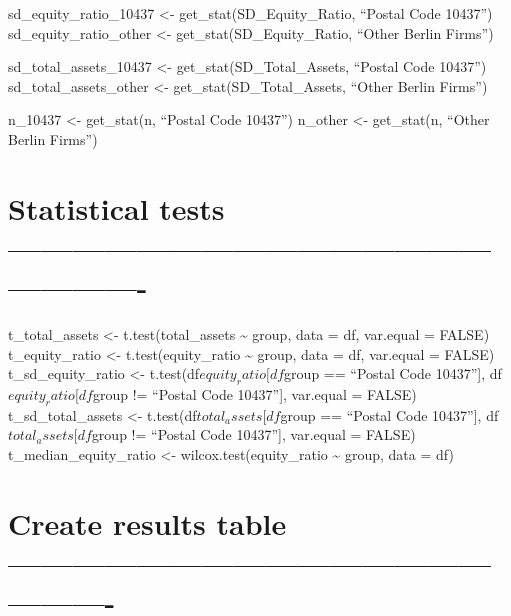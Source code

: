 \documentclass[
]{article}
\begin{document}
sd\_equity\_ratio\_10437 \textless- get\_stat(SD\_Equity\_Ratio,
``Postal Code 10437'') sd\_equity\_ratio\_other \textless-
get\_stat(SD\_Equity\_Ratio, ``Other Berlin Firms'')

sd\_total\_assets\_10437 \textless- get\_stat(SD\_Total\_Assets,
``Postal Code 10437'') sd\_total\_assets\_other \textless-
get\_stat(SD\_Total\_Assets, ``Other Berlin Firms'')

n\_10437 \textless- get\_stat(n, ``Postal Code 10437'') n\_other
\textless- get\_stat(n, ``Other Berlin Firms'')

\hypertarget{statistical-tests--}{%
\section{Statistical tests
----------------------------------------------------------}\label{statistical-tests--}}

t\_total\_assets \textless- t.test(total\_assets \textasciitilde{}
group, data = df, var.equal = FALSE) t\_equity\_ratio \textless-
t.test(equity\_ratio \textasciitilde{} group, data = df, var.equal =
FALSE) t\_sd\_equity\_ratio \textless- t.test(df\(equity_ratio[df\)group
== ``Postal Code 10437''{]}, df\(equity_ratio[df\)group != ``Postal Code
10437''{]}, var.equal = FALSE) t\_sd\_total\_assets \textless-
t.test(df\(total_assets[df\)group == ``Postal Code 10437''{]},
df\(total_assets[df\)group != ``Postal Code 10437''{]}, var.equal =
FALSE) t\_median\_equity\_ratio \textless- wilcox.test(equity\_ratio
\textasciitilde{} group, data = df)

\hypertarget{create-results-table--}{%
\section{Create results table
-------------------------------------------------------}\label{create-results-table--}}
\end{document}
